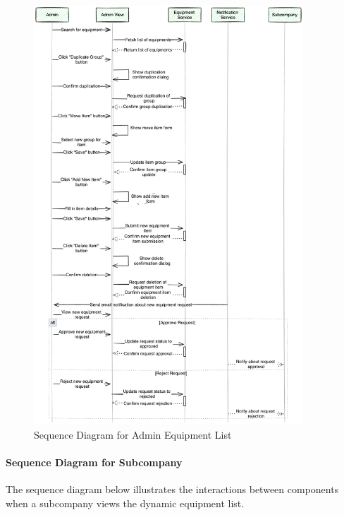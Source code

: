 \begin{figure}[H]
    \centering
    \includegraphics[width=0.9\textwidth]{src/assets/diagrams/adminEquipementList.png}
    \caption{Sequence Diagram for Admin Equipment List}
    \label{fig:sequence_diagram_admin}
\end{figure}

\paragraph{Sequence Diagram for Subcompany}
The sequence diagram below illustrates the interactions between components when a subcompany views the dynamic equipment list.

